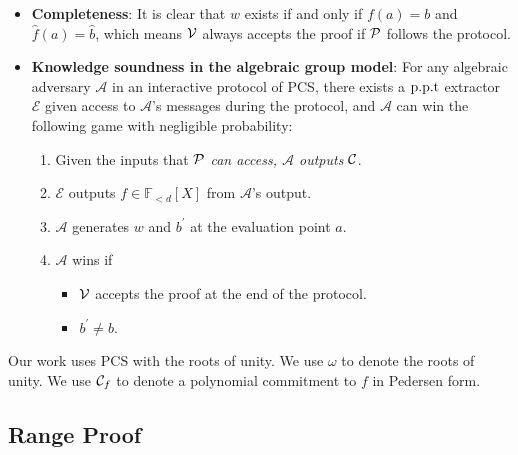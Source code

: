\begin{definition}
\begin{enumerate}
\begin{enumerate}
    \end{enumerate}
\end{enumerate}
\begin{itemize}
    \item \textbf{Completeness}: It is clear that $w$ exists if and only if $f(a)=b$ and $\hat{f}(a)=\hat{b}$, which means $\mathcal{V}$ always accepts the proof if $\mathcal{P}$ follows the protocol.
    \item \textbf{Knowledge soundness in the algebraic group model}: For any algebraic adversary $\mathcal{A}$ in an interactive protocol of PCS, there exists a $\text{p.p.t}$ extractor $\mathcal{E}$ given access to $\mathcal{A}$'s messages during the protocol, and $\mathcal{A}$ can win the following game with negligible probability:
    \begin{enumerate}
        \item Given the inputs that $\mathcal{P}$ \textit{can access, $\mathcal{A}$ outputs} $\mathcal{C}$.
        \item $\mathcal{E}$ outputs $f\in\mathbb{F}_{<d}[X]$ from $\mathcal{A}$'s output.
        \item $\mathcal{A}$ generates $w$ and $b^\prime$ at the evaluation point $a$.
        \item $\mathcal{A}$ wins if
        \begin{itemize}
            \item $\mathcal{V}$ accepts the proof at the end of the protocol.
            \item $b^\prime\ne{b}$.
        \end{itemize}
    \end{enumerate}
\end{itemize}
\end{definition}
Our work uses PCS with the roots of unity. We use $\omega$ to denote the roots of unity. We use $\mathcal{C}_f$ to denote a polynomial commitment to $f$ in Pedersen form.

\subsection{Range Proof}
\label{sec:range}

